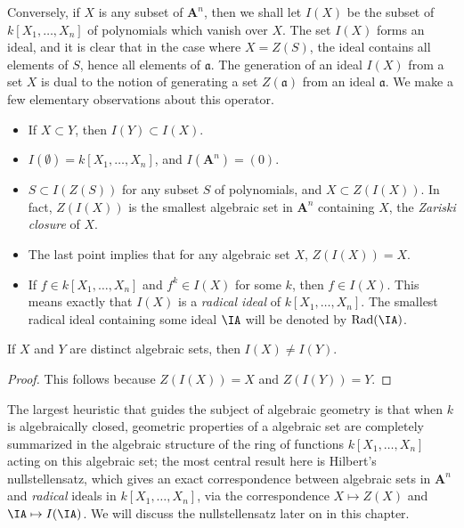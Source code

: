 Conversely, if $X$ is any subset of $\mathbf{A}^n$, then we shall let $I(X)$ be the subset of $k[X_1, \dots, X_n]$ of polynomials which vanish over $X$. The set $I(X)$ forms an ideal, and it is clear that in the case where $X = Z(S)$, the ideal contains all elements of $S$, hence all elements of $\mathfrak{a}$. The generation of an ideal $I(X)$ from a set $X$ is dual to the notion of generating a set $Z(\mathfrak{a})$ from an ideal $\mathfrak{a}$. We make a few elementary observations about this operator.
%
\begin{itemize}
    \item If $X \subset Y$, then $I(Y) \subset I(X)$.
    \item $I(\emptyset) = k[X_1, \dots, X_n]$, and $I(\mathbf{A}^n) = (0)$.
    \item $S \subset I(Z(S))$ for any subset $S$ of polynomials, and $X \subset Z(I(X))$. In fact, $Z(I(X))$ is the smallest algebraic set in $\mathbf{A}^n$ containing $X$, the \emph{Zariski closure} of $X$.
    \item The last point implies that for any algebraic set $X$, $Z(I(X)) = X$.%
    \item If $f \in k[X_1,\dots,X_n]$ and $f^k \in I(X)$ for some $k$, then $f \in I(X)$. This means exactly that $I(X)$ is a \emph{radical ideal} of $k[X_1,\dots,X_n]$. The smallest radical ideal containing some ideal $\IA$ will be denoted by $\text{Rad}(\IA)$.
\end{itemize}

\begin{prop}
    If $X$ and $Y$ are distinct algebraic sets, then $I(X) \neq I(Y)$.
\end{prop}
\begin{proof}
    This follows because $Z(I(X)) = X$ and $Z(I(Y)) = Y$.
\end{proof}

The largest heuristic that guides the subject of algebraic geometry is that when $k$ is algebraically closed, geometric properties of a algebraic set are completely summarized in the algebraic structure of the ring of functions $k[X_1,\dots,X_n]$ acting on this algebraic set; the most central result here is Hilbert's nullstellensatz, which gives an exact correspondence between algebraic sets in $\mathbf{A}^n$ and \emph{radical} ideals in $k[X_1,\dots,X_n]$, via the correspondence $X \mapsto Z(X)$ and $\IA \mapsto I(\IA)$. We will discuss the nullstellensatz later on in this chapter.


